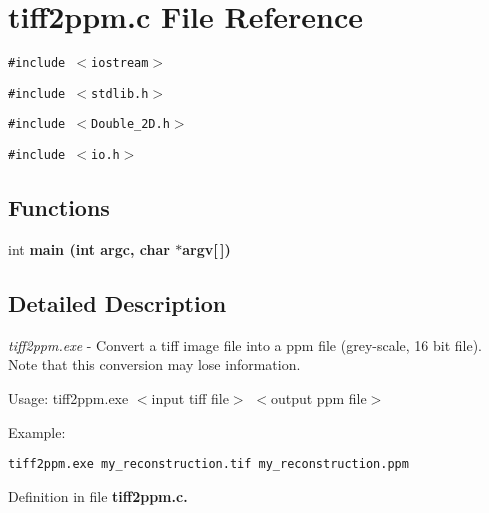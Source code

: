 \section{tiff2ppm.c File Reference}
\label{tiff2ppm_8c}
{\tt \#include $<$iostream$>$}\par
{\tt \#include $<$stdlib.h$>$}\par
{\tt \#include $<$Double\_\-2D.h$>$}\par
{\tt \#include $<$io.h$>$}\par
\subsection*{Functions}
\begin{CompactItemize}
\item 
int \bf{main} (int argc, char $\ast$argv[$\,$])\label{tiff2ppm_8c_28052c36c3b61c6c0eaa18f5d226118f}

\end{CompactItemize}


\subsection{Detailed Description}
{\em tiff2ppm.exe\/} - Convert a tiff image file into a ppm file (grey-scale, 16 bit file). Note that this conversion may lose information.

\begin{Desc}
\item[Usage: tiff2ppm.exe $<$input tiff file$>$ $<$output ppm file$>$ ]\end{Desc}
\begin{Desc}
\item[Example:]

\footnotesize\begin{verbatim}tiff2ppm.exe my_reconstruction.tif my_reconstruction.ppm \end{verbatim}
\normalsize
 \end{Desc}


Definition in file \bf{tiff2ppm.c}.